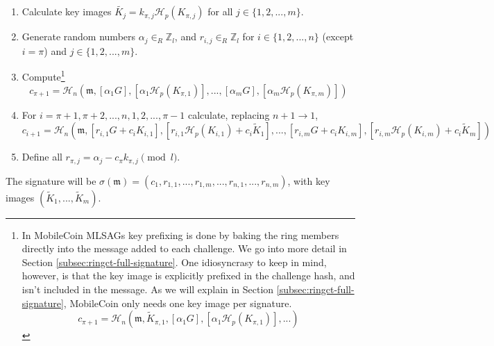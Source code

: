 \begin{enumerate}
	\item Calculate key images \(\tilde{K_j} = k_{\pi, j} \mathcal{H}_p(K_{\pi, j})\) for all \(j \in \{1, 2, ..., m\}\).

	\item Generate random numbers  \(\alpha_j \in_R \mathbb{Z}_l\), and \(r_{i, j} \in_R \mathbb{Z}_l\) for \(i \in \{1, 2, ..., n\}\) (except \(i = \pi\)) and \(j \in \{1, 2, ..., m\}\).

	\item Compute\footnote{\label{footnote:mobilecoin-challenge-ideosyncracies}In MobileCoin MLSAGs key prefixing is done by baking the ring members directly into the message added to each challenge. We go into more detail in Section \ref{subsec:ringct-full-signature}. One idiosyncrasy to keep in mind, however, is that the key image is explicitly prefixed in the challenge hash, and isn't included in the message. As we will explain in Section \ref{subsec:ringct-full-signature}, MobileCoin only needs one key image per signature.\vspace{-.15cm}
	\[c_{\pi+1} = \mathcal{H}_n(\mathfrak{m}, \tilde{K}_{\pi, 1}, [\alpha_1 G], [\alpha_1 \mathcal{H}_p(K_{\pi, 1})], ...)
	\]}
	\[c_{\pi+1} = \mathcal{H}_n(\mathfrak{m}, [\alpha_1 G], [\alpha_1 \mathcal{H}_p(K_{\pi, 1})], ..., [\alpha_m G], [\alpha_m \mathcal{H}_p(K_{\pi, m})])\]

	\item For \(i = \pi+1, \pi+2, ..., n, 1, 2, ..., \pi-1\) calculate, replacing \(n + 1 \rightarrow 1\),\vspace{.175cm}
	\[ c_{i+1} = \mathcal{H}_n(\mathfrak{m}, [r_{i, 1} G + c_i K_{i, 1}], [r_{i, 1} \mathcal{H}_p(K_{i, 1}) + c_i \tilde{K}_1], 
	..., [r_{i, m} G + c_i K_{i, m}], [r_{i, m} \mathcal{H}_p(K_{i, m}) + c_i \tilde{K}_m])\]

	\item Define all \(r_{\pi, j} = \alpha_j - c_\pi k_{\pi, j} \pmod l\).
\end{enumerate}

The signature will be \(\sigma(\mathfrak{m}) = (c_1, r_{1, 1}, ..., r_{1, m}, ..., r_{n, 1}, ..., r_{n, m}) \), with key images $(\tilde{K}_1, ...,  \tilde{K}_m)$.



